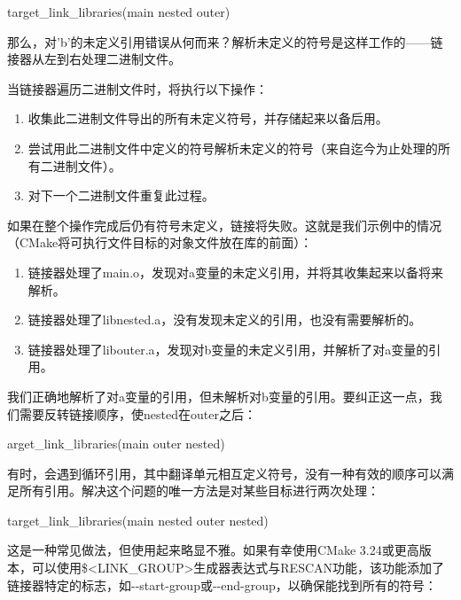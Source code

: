\begin{cmake}
target_link_libraries(main nested outer)
\end{cmake}

那么，对’b’的未定义引用错误从何而来？解析未定义的符号是这样工作的——链接器从左到右处理二进制文件。

当链接器遍历二进制文件时，将执行以下操作：

\begin{enumerate}
\item
收集此二进制文件导出的所有未定义符号，并存储起来以备后用。

\item
尝试用此二进制文件中定义的符号解析未定义的符号（来自迄今为止处理的所有二进制文件）。

\item
对下一个二进制文件重复此过程。
\end{enumerate}

如果在整个操作完成后仍有符号未定义，链接将失败。这就是我们示例中的情况（CMake将可执行文件目标的对象文件放在库的前面）：

\begin{enumerate}
\item
链接器处理了main.o，发现对a变量的未定义引用，并将其收集起来以备将来解析。

\item
链接器处理了libnested.a，没有发现未定义的引用，也没有需要解析的。

\item
链接器处理了libouter.a，发现对b变量的未定义引用，并解析了对a变量的引用。
\end{enumerate}

我们正确地解析了对a变量的引用，但未解析对b变量的引用。要纠正这一点，我们需要反转链接顺序，使nested在outer之后：

\begin{cmake}
arget_link_libraries(main outer nested)
\end{cmake}

有时，会遇到循环引用，其中翻译单元相互定义符号，没有一种有效的顺序可以满足所有引用。解决这个问题的唯一方法是对某些目标进行两次处理：

\begin{cmake}
target_link_libraries(main nested outer nested)
\end{cmake}

这是一种常见做法，但使用起来略显不雅。如果有幸使用CMake 3.24或更高版本，可以使用\$<LINK\_GROUP>生成器表达式与RESCAN功能，该功能添加了链接器特定的标志，如-{}-start-group或-{}-end-group，以确保能找到所有的符号：

